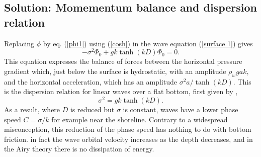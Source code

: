 

\subsection{Solution: Momementum balance and dispersion relation}
Replacing $\phi$ by eq. (\ref{phi1}) using (\ref{cosh}) in the wave equation (\ref{surface 1}) gives  
\begin{equation}
    - \sigma^2 \Phi_0 +gk\tanh\left(kD\right)\Phi_0=0.
     \label{onde 1}
\end{equation}
This equation expresses the balance of forces between the horizontal pressure gradient which, just below the surface 
is hydrostatic, with an amplitude  $\rho_w g a k$, and the horizontal acceleration, which has an amplitude  $\sigma^2 a / \tanh(kD)$. 
This is the dispersion relation for linear waves over a flat bottom, first given by \cite{Laplace1776}, 
\begin{equation}
    \sigma^2=g k \tanh\left(kD\right).
     \label{dispersion}
\end{equation}
As a result, where $D$ is reduced but $\sigma$ is constant, waves have a lower phase speed $C=\sigma/k$  for example near the shoreline. 
Contrary to a widespread misconception, this reduction of the phase speed has nothing to do with bottom friction.
in fact the wave orbital velocity increases as the depth decreases, and in the Airy theory there is no dissipation of energy.




